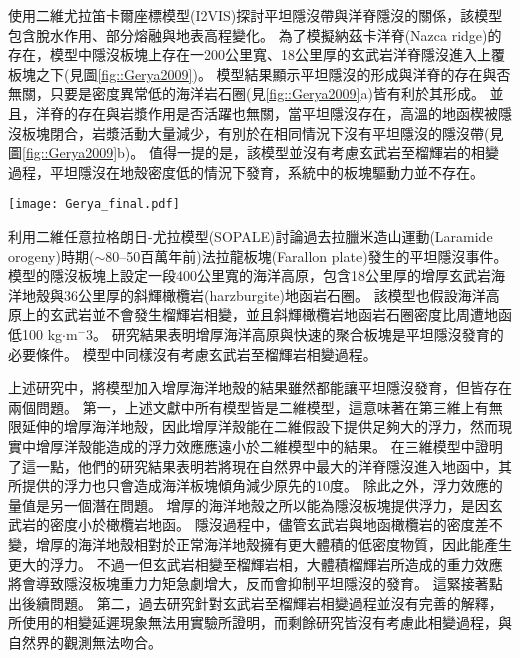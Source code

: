 \citealp{Gerya2009}使用二維尤拉笛卡爾座標模型(I2VIS)探討平坦隱沒帶與洋脊隱沒的關係，該模型包含脫水作用、部分熔融與地表高程變化。
為了模擬納茲卡洋脊(Nazca ridge)的存在，模型中隱沒板塊上存在一200公里寬、18公里厚的玄武岩洋脊隱沒進入上覆板塊之下(見圖\ref{fig::Gerya2009})。
模型結果顯示平坦隱沒的形成與洋脊的存在與否無關，只要是密度異常低的海洋岩石圈(見\ref{fig::Gerya2009}a)皆有利於其形成。
並且，洋脊的存在與岩漿作用是否活躍也無關，當平坦隱沒存在，高溫的地函楔被隱沒板塊閉合，岩漿活動大量減少，有別於在相同情況下沒有平坦隱沒的隱沒帶(見圖\ref{fig::Gerya2009}b)。
值得一提的是，該模型並沒有考慮玄武岩至榴輝岩的相變過程，平坦隱沒在地殼密度低的情況下發育，系統中的板塊驅動力並不存在。

\begin{figure*}[ht!]
    \centering
    \texttt{[image: Gerya\_final.pdf]}
    \caption[\citealp{Gerya2009}平坦隱沒模型結果]{\citealp{Gerya2009}中平坦隱沒模型於第12個百萬年的結果。圖組(a)與圖組(b)分別為隱沒海洋地函岩石圈密度$3100 kgm^{-3}$與$3300 kgm^{-3}$的結果。(a)上圖與(b)上圖為包含洋脊隱沒的模型，(a)(b)下圖為不包含洋脊的模型，圖中白線為等溫線。其中，顏色代表不同岩相：1、2=大陸地殼、3、4=沈積物、5、6=玄武岩、7、8=輝長岩、9、10=無水地函、11=蛇紋岩、12、13、14=含水地函。
    }
    \label{fig::Gerya2009}
\end{figure*}

\citealp{Liu2016}利用二維任意拉格朗日-尤拉模型(SOPALE)討論過去拉臘米造山運動(Laramide orogeny)時期($\sim$80–50百萬年前)法拉龍板塊(Farallon plate)發生的平坦隱沒事件。
模型的隱沒板塊上設定一段400公里寬的海洋高原，包含18公里厚的增厚玄武岩海洋地殼與36公里厚的斜輝橄欖岩(harzburgite)地函岩石圈。
該模型也假設海洋高原上的玄武岩並不會發生榴輝岩相變，並且斜輝橄欖岩地函岩石圈密度比周遭地函低100 kg$\cdot$m$^-3$。
研究結果表明增厚海洋高原與快速的聚合板塊是平坦隱沒發育的必要條件。
模型中同樣沒有考慮玄武岩至榴輝岩相變過程。

上述研究中，將模型加入增厚海洋地殼的結果雖然都能讓平坦隱沒發育，但皆存在兩個問題。
第一，上述文獻中所有模型皆是二維模型，這意味著在第三維上有無限延伸的增厚海洋地殼，因此增厚洋殼能在二維假設下提供足夠大的浮力，然而現實中增厚洋殼能造成的浮力效應應遠小於二維模型中的結果。
\citealp{florez2019impact}在三維模型中證明了這一點，他們的研究結果表明若將現在自然界中最大的洋脊隱沒進入地函中，其所提供的浮力也只會造成海洋板塊傾角減少原先的10度。
除此之外，浮力效應的量值是另一個潛在問題。
增厚的海洋地殼之所以能為隱沒板塊提供浮力，是因玄武岩的密度小於橄欖岩地函。
隱沒過程中，儘管玄武岩與地函橄欖岩的密度差不變，增厚的海洋地殼相對於正常海洋地殼擁有更大體積的低密度物質，因此能產生更大的浮力。
不過一但玄武岩相變至榴輝岩相，大體積榴輝岩所造成的重力效應將會導致隱沒板塊重力力矩急劇增大，反而會抑制平坦隱沒的發育。
這緊接著點出後續問題。
第二，過去研究針對玄武岩至榴輝岩相變過程並沒有完善的解釋，\citealp{van2002role}所使用的相變延遲現象無法用實驗所證明，而剩餘研究皆沒有考慮此相變過程，與自然界的觀測無法吻合。

